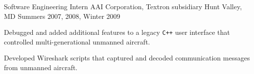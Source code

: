 \begin{cventries}
  \cventry
    {Software Engineering Intern} %
    {AAI Corporation, Textron subsidiary} %
    {Hunt Valley, MD} %
    {Summers 2007, 2008, Winter 2009} %
    {
      \begin{cvitems} %
      \item {Debugged and added additional features to a legacy {\texttt{C++}} user
          interface that controlled multi-generational unmanned aircraft.}
      \item {Developed Wireshark scripts that captured and decoded communication messages
          from unmanned aircraft.}
      \end{cvitems}
    }

\end{cventries}
